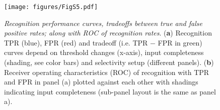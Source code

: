 \begin{figure}[H]
    \centering
    \texttt{[image: figures/FigS5.pdf]}
    \caption{
    \textit{Recognition performance curves, tradeoffs between true and false positive rates; along with ROC of recognition rates}.
    (\textbf{a})
        Recognition TPR (blue), FPR (red) and tradeoff (i.e. TPR $-$ FPR in green) curves
            depend on threshold changes (x-axis),
            input completeness (shading, see color bars)
            and selectivity setup (different panels).
    (\textbf{b}) Receiver operating characteristics (ROC) of recognition
        with TPR and FPR in panel (a) plotted against each other
        with shadings indicating input completeness
        (sub-panel layout is the same as panel a).
    }
    \label{supp:ffwd-recog-tradeoff-roc}
\end{figure}
